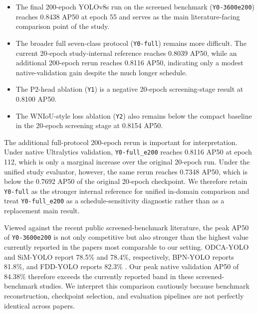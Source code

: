 \begin{itemize}[leftmargin=1.5em]
  \item The final 200-epoch YOLOv8s run on the screened benchmark (\texttt{Y0-3600e200}) reaches 0.8438 AP50 at epoch 55 and serves as the main literature-facing comparison point of the study.
  \item The broader full seven-class protocol (\texttt{Y0-full}) remains more difficult. The current 20-epoch study-internal reference reaches 0.8039 AP50, while an additional 200-epoch rerun reaches 0.8116 AP50, indicating only a modest native-validation gain despite the much longer schedule.
  \item The P2-head ablation (\texttt{Y1}) is a negative 20-epoch screening-stage result at 0.8100 AP50.
  \item The WNIoU-style loss ablation (\texttt{Y2}) also remains below the compact baseline in the 20-epoch screening stage at 0.8154 AP50.
\end{itemize}

The additional full-protocol 200-epoch rerun is important for interpretation. Under native Ultralytics validation, \texttt{Y0-full\_e200} reaches 0.8116 AP50 at epoch 112, which is only a marginal increase over the original 20-epoch run. Under the unified study evaluator, however, the same rerun reaches 0.7348 AP50, which is below the 0.7692 AP50 of the original 20-epoch checkpoint. We therefore retain \texttt{Y0-full} as the stronger internal reference for unified in-domain comparison and treat \texttt{Y0-full\_e200} as a schedule-sensitivity diagnostic rather than as a replacement main result.

Viewed against the recent public screened-benchmark literature, the peak AP50 of \texttt{Y0-3600e200} is not only competitive but also stronger than the highest value currently reported in the papers most comparable to our setting. ODCA-YOLO and SiM-YOLO report 78.5\% and 78.4\%, respectively, BPN-YOLO reports 81.8\%, and FDD-YOLO reports 82.3\% \citep{odca_yolo,bpn_yolo,sim_yolo,fdd_yolo}. Our peak native validation AP50 of 84.38\% therefore exceeds the currently reported band in these screened-benchmark studies. We interpret this comparison cautiously because benchmark reconstruction, checkpoint selection, and evaluation pipelines are not perfectly identical across papers.

